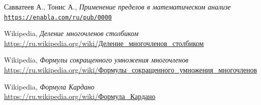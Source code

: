 \documentclass[12pt]{article}
\begin{document}
\begin{thebibliography}{9}
	Савватеев А., Тонис А., \textit{Применение пределов в математическом анализе}
	\\\texttt{\url{https://enabla.com/ru/pub/0000}}
	
	Wikipedia, \textit{Деление многочленов столбиком}
	\\\href{https://ru.wikipedia.org/wiki/\%D0\%94\%D0\%B5\%D0\%BB\%D0\%B5\%D0\%BD\%D0\%B8\%D0\%B5_\%D0\%BC\%D0\%BD\%D0\%BE\%D0\%B3\%D0\%BE\%D1\%87\%D0\%BB\%D0\%B5\%D0\%BD\%D0\%BE\%D0\%B2_\%D1\%81\%D1\%82\%D0\%BE\%D0\%BB\%D0\%B1\%D0\%B8\%D0\%BA\%D0\%BE\%D0\%BC}{https://ru.wikipedia.org/wiki/Деление\_многочленов\_столбиком}

	Wikipedia, \textit{Формулы сокращенного умножения многочленов}
	\\\href{https://ru.wikipedia.org/wiki/\%D0\%A4\%D0\%BE\%D1\%80\%D0\%BC\%D1\%83\%D0\%BB\%D1\%8B\_\%D1\%81\%D0\%BE\%D0\%BA\%D1\%80\%D0\%B0\%D1\%89\%D1\%91\%D0\%BD\%D0\%BD\%D0\%BE\%D0\%B3\%D0\%BE\_\%D1\%83\%D0\%BC\%D0\%BD\%D0\%BE\%D0\%B6\%D0\%B5\%D0\%BD\%D0\%B8\%D1\%8F\_\%D0\%BC\%D0\%BD\%D0\%BE\%D0\%B3\%D0\%BE\%D1\%87\%D0\%BB\%D0\%B5\%D0\%BD\%D0\%BE\%D0\%B2}{https://ru.wikipedia.org/wiki/Формулы\_сокращенного\_умножения\_многочленов}

	Wikipedia, \textit{Формула Кардано}
	\\\href{https://ru.wikipedia.org/wiki/\%D0\%A4\%D0\%BE\%D1\%80\%D0\%BC\%D1\%83\%D0\%BB\%D0\%B0\_\%D0\%9A\%D0\%B0\%D1\%80\%D0\%B4\%D0\%B0\%D0\%BD\%D0\%BE}{https://ru.wikipedia.org/wiki/Формула\_Кардано}
\end{thebibliography}
\end{document}
